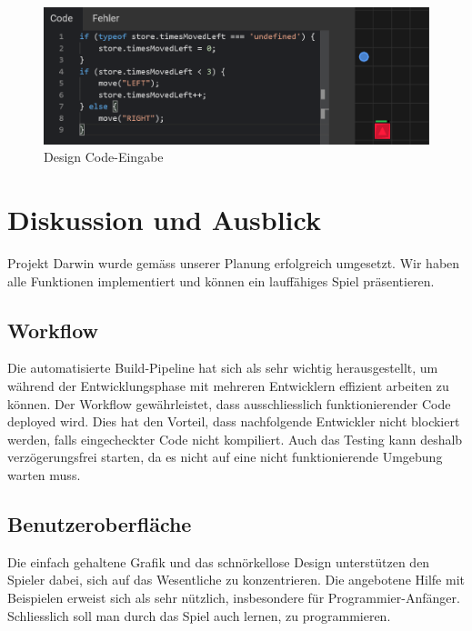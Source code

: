 \documentclass[11pt,a4paper,titlepage]{article}
\begin{document}
\begin{figure}[H]
	\centering
	\includegraphics{game2.png}
	\caption{Design Code-Eingabe}
	\label{code-eingabe}
\end{figure}

\newpage

\section{Diskussion und Ausblick}
%

Projekt Darwin wurde gemäss unserer Planung erfolgreich umgesetzt. Wir haben alle Funktionen implementiert und können ein lauffähiges Spiel präsentieren.

\subsection{Workflow}

Die automatisierte Build-Pipeline hat sich als sehr wichtig herausgestellt, um während der Entwicklungsphase mit mehreren Entwicklern effizient arbeiten zu können. Der Workflow gewährleistet, dass ausschliesslich funktionierender Code deployed wird. Dies hat den Vorteil, dass nachfolgende Entwickler nicht blockiert werden, falls eingecheckter Code nicht kompiliert. Auch das Testing kann deshalb verzögerungsfrei starten, da es nicht auf eine nicht funktionierende Umgebung warten muss.

\subsection{Benutzeroberfläche}

Die einfach gehaltene Grafik und das schnörkellose Design unterstützen den Spieler dabei, sich auf das Wesentliche zu konzentrieren.
Die angebotene Hilfe mit Beispielen erweist sich als sehr nützlich, insbesondere für Programmier-Anfänger. Schliesslich soll man durch das Spiel auch lernen, zu programmieren.
\end{document}

